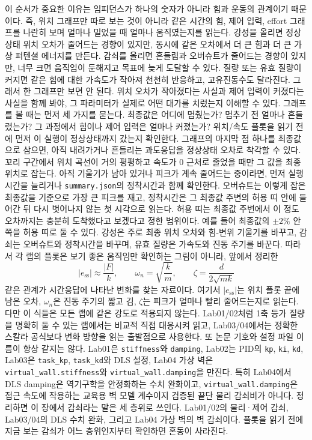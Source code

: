 이 순서가 중요한 이유는 임피던스가 하나의 숫자가 아니라 힘과 운동의 관계이기 때문이다.
즉, 위치 그래프만 따로 보는 것이 아니라 같은 시간의 힘, 제어 입력, effort 그래프를 나란히 보며 얼마나 밀었을 때 얼마나 움직였는지를 읽는다.
강성을 올리면 정상상태 위치 오차가 줄어드는 경향이 있지만, 동시에 같은 오차에서 더 큰 힘과 더 큰 가상 퍼텐셜 에너지를 만든다.
감쇠를 올리면 흔들림과 오버슈트가 줄어드는 경향이 있지만, 너무 크면 움직임이 둔해지고 목표에 늦게 도달할 수 있다.
질량 또는 유효 질량이 커지면 같은 힘에 대한 가속도가 작아져 천천히 반응하고, 고유진동수도 달라진다.
그래서 한 그래프만 보면 안 된다.
위치 오차가 작아졌다는 사실과 제어 입력이 커졌다는 사실을 함께 봐야, 그 파라미터가 실제로 어떤 대가를 치렀는지 이해할 수 있다.
그래프를 볼 때는 먼저 세 가지를 묻는다.
최종값은 어디에 멈췄는가?
멈추기 전 얼마나 흔들렸는가?
그 과정에서 힘이나 제어 입력은 얼마나 커졌는가?
위치/속도 플롯을 읽기 전에 먼저 이 실행이 정상상태까지 갔는지 확인한다.
그래프의 마지막 점 하나를 최종값으로 삼으면, 아직 내려가거나 흔들리는 과도응답을 정상상태 오차로 착각할 수 있다.
꼬리 구간에서 위치 곡선이 거의 평평하고 속도가 0 근처로 줄었을 때만 그 값을 최종 위치로 잡는다.
아직 기울기가 남아 있거나 피크가 계속 줄어드는 중이라면, 먼저 실행 시간을 늘리거나 \texttt{summary.json}의 정착시간과 함께 확인한다.
오버슈트는 이렇게 잡은 최종값을 기준으로 가장 큰 피크를 재고, 정착시간은 그 최종값 주변의 허용 띠 안에 들어간 뒤 다시 벗어나지 않는 첫 시각으로 읽는다.
허용 띠는 최종값 주변에서 이 정도 오차까지는 충분히 도착했다고 보겠다고 정한 범위이다.
예를 들어 최종값의 $\pm2\%$ 안쪽을 허용 띠로 둘 수 있다.
강성은 주로 최종 위치 오차와 힘-변위 기울기를 바꾸고, 감쇠는 오버슈트와 정착시간을 바꾸며, 유효 질량은 가속도와 진동 주기를 바꾼다.
따라서 각 랩의 플롯은 보기 좋은 움직임만 확인하는 그림이 아니라, 앞에서 정리한
\begin{equation}
  |e_{\mathrm{ss}}|\approx \frac{|F|}{k},
  \qquad
  \omega_n=\sqrt{\frac{k}{m}},
  \qquad
  \zeta=\frac{d}{2\sqrt{mk}}
\end{equation}
같은 관계가 시간응답에 나타난 변화를 찾는 자료이다.
여기서 $|e_{\mathrm{ss}}|$는 위치 플롯 끝에 남은 오차, $\omega_n$은 진동 주기의 짧고 김, $\zeta$는 피크가 얼마나 빨리 줄어드는지로 읽는다.
다만 이 식들은 모든 랩에 같은 강도로 적용되지 않는다.
Lab01/02처럼 1축 등가 질량을 명확히 둘 수 있는 랩에서는 비교적 직접 대응시켜 읽고, Lab03/04에서는 정확한 스칼라 공식보다 변화 방향을 읽는 출발점으로 사용한다.
또 논문 기호와 설정 파일 이름이 항상 같지는 않다.
Lab01은 \texttt{stiffness}와 \texttt{damping}, Lab02는 PID의 \texttt{kp}, \texttt{ki}, \texttt{kd}, Lab03은 \texttt{task\_kp}, \texttt{task\_kd}와 DLS 설정, Lab04 가상 벽은 \texttt{virtual\_wall.stiffness}와 \texttt{virtual\_wall.damping}을 만진다.
특히 Lab04에서 DLS damping은 역기구학을 안정화하는 수치 완화이고, \texttt{virtual\_wall.damping}은 접근 속도에 작용하는 교육용 벽 모델 계수이지 검증된 끝단 물리 감쇠비가 아니다.
정리하면 이 장에서 감쇠라는 말은 세 층위로 쓰인다.
Lab01/02의 물리·제어 감쇠, Lab03/04의 DLS 수치 완화, 그리고 Lab04 가상 벽의 벽 감쇠이다.
플롯을 읽기 전에 지금 보는 감쇠가 어느 층위인지부터 확인하면 혼동이 사라진다.
%

